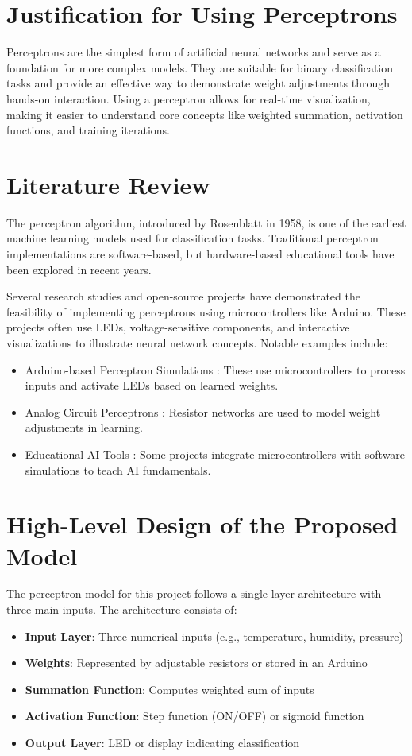 \documentclass[a4paper,10pt]{article}
\begin{document}
\section{Justification for Using Perceptrons}
Perceptrons are the simplest form of artificial neural networks and serve as a foundation for more complex models. They are suitable for binary classification tasks and provide an effective way to demonstrate weight adjustments through hands-on interaction. Using a perceptron allows for real-time visualization, making it easier to understand core concepts like weighted summation, activation functions, and training iterations.

\section{Literature Review}
The perceptron algorithm, introduced by Rosenblatt in 1958, is one of the earliest machine learning models used for classification tasks. Traditional perceptron implementations are software-based, but hardware-based educational tools have been explored in recent years. 

Several research studies and open-source projects have demonstrated the feasibility of implementing perceptrons using microcontrollers like Arduino. These projects often use LEDs, voltage-sensitive components, and interactive visualizations to illustrate neural network concepts. Notable examples include:

\begin{itemize}
    \item Arduino-based Perceptron Simulations : These use microcontrollers to process inputs and activate LEDs based on learned weights.
    \item Analog Circuit Perceptrons : Resistor networks are used to model weight adjustments in learning.
    \item Educational AI Tools : Some projects integrate microcontrollers with software simulations to teach AI fundamentals.
\end{itemize}

\section{High-Level Design of the Proposed Model}

The perceptron model for this project follows a single-layer architecture with three main inputs. The architecture consists of:

\begin{itemize}
    \item \textbf{Input Layer}: Three numerical inputs (e.g., temperature, humidity, pressure)
    \item \textbf{Weights}: Represented by adjustable resistors or stored in an Arduino
    \item \textbf{Summation Function}: Computes weighted sum of inputs
    \item \textbf{Activation Function}: Step function (ON/OFF) or sigmoid function
    \item \textbf{Output Layer}: LED or display indicating classification
\end{itemize}
\end{document}
